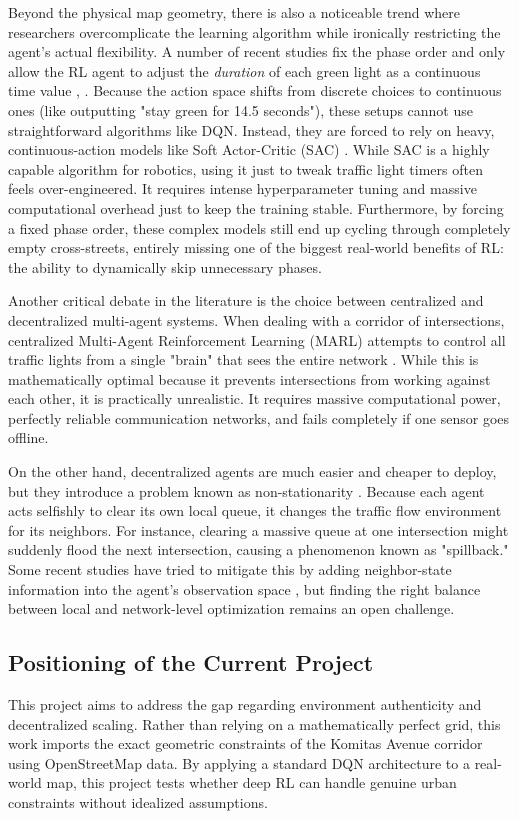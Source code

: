 \documentclass[conference]{IEEEtran}
\begin{document}
Beyond the physical map geometry, there is also a noticeable trend where researchers overcomplicate the learning algorithm while ironically restricting the agent's actual flexibility. A number of recent studies fix the phase order and only allow the RL agent to adjust the \textit{duration} of each green light as a continuous time value \cite{b7}, \cite{b8}. Because the action space shifts from discrete choices to continuous ones (like outputting "stay green for 14.5 seconds"), these setups cannot use straightforward algorithms like DQN. Instead, they are forced to rely on heavy, continuous-action models like Soft Actor-Critic (SAC) \cite{b9}. While SAC is a highly capable algorithm for robotics, using it just to tweak traffic light timers often feels over-engineered. It requires intense hyperparameter tuning and massive computational overhead just to keep the training stable. Furthermore, by forcing a fixed phase order, these complex models still end up cycling through completely empty cross-streets, entirely missing one of the biggest real-world benefits of RL: the ability to dynamically skip unnecessary phases.

Another critical debate in the literature is the choice between centralized and decentralized multi-agent systems. When dealing with a corridor of intersections, centralized Multi-Agent Reinforcement Learning (MARL) attempts to control all traffic lights from a single "brain" that sees the entire network \cite{b10}. While this is mathematically optimal because it prevents intersections from working against each other, it is practically unrealistic. It requires massive computational power, perfectly reliable communication networks, and fails completely if one sensor goes offline.

On the other hand, decentralized agents are much easier and cheaper to deploy, but they introduce a problem known as non-stationarity \cite{b10}. Because each agent acts selfishly to clear its own local queue, it changes the traffic flow environment for its neighbors. For instance, clearing a massive queue at one intersection might suddenly flood the next intersection, causing a phenomenon known as "spillback." Some recent studies have tried to mitigate this by adding neighbor-state information into the agent's observation space \cite{b10}, but finding the right balance between local and network-level optimization remains an open challenge.

\subsection{Positioning of the Current Project}
This project aims to address the gap regarding environment authenticity and decentralized scaling. Rather than relying on a mathematically perfect grid, this work imports the exact geometric constraints of the Komitas Avenue corridor using OpenStreetMap data. By applying a standard DQN architecture to a real-world map, this project tests whether deep RL can handle genuine urban constraints without idealized assumptions.
\end{document}
